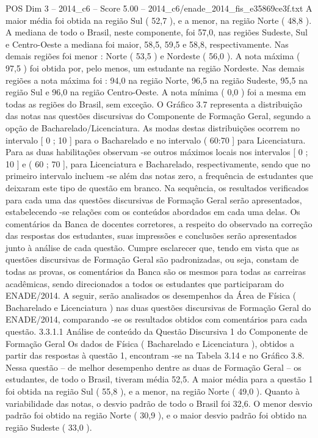 \begin{textsample}{POS Dim 3 – 2014\_c6 – Score 5.00 – 2014\_c6/enade\_2014\_fis\_e35869ce3f.txt}
A maior média foi obtida na região Sul ( 52,7 ), e a menor, na região Norte ( 48,8 ).
A mediana de todo o Brasil, neste componente, foi 57,0, nas regiões Sudeste, Sul e Centro-Oeste a mediana foi maior, 58,5, 59,5 e 58,8, respectivamente.
Nas demais regiões foi menor : Norte ( 53,5 ) e Nordeste ( 56,0 ).
A nota máxima ( 97,5 ) foi obtida por, pelo menos, um estudante na região Nordeste.
Nas demais regiões a nota máxima foi : 94,0 na região Norte, 96,5 na região Sudeste, 95,5 na região Sul e 96,0 na região Centro-Oeste.
A nota mínima ( 0,0 ) foi a mesma em todas as regiões do Brasil, sem exceção.
O Gráfico 3.7 representa a distribuição das notas nas questões discursivas do Componente de Formação Geral, segundo a opção de Bacharelado/Licenciatura.
As modas destas distribuições ocorrem no intervalo [ 0 ; 10 ] para o Bacharelado e no intervalo ( 60:70 ] para Licenciatura.
Para as duas habilitações observam -se outros máximos locais nos intervalos [ 0 ; 10 ] e ( 60 ; 70 ], para Licenciatura e Bacharelado, respectivamente, sendo que no primeiro intervalo incluem -se além das notas zero, a frequência de estudantes que deixaram este tipo de questão em branco.
Na sequência, os resultados verificados para cada uma das questões discursivas de Formação Geral serão apresentados, estabelecendo -se relações com os conteúdos abordados em cada uma delas.
Os comentários da Banca de docentes corretores, a respeito do observado na correção das respostas dos estudantes, suas impressões e conclusões serão apresentados junto à análise de cada questão.
Cumpre esclarecer que, tendo em vista que as questões discursivas de Formação Geral são padronizadas, ou seja, constam de todas as provas, os comentários da Banca são os mesmos para todas as carreiras acadêmicas, sendo direcionados a todos os estudantes que participaram do ENADE/2014.
A seguir, serão analisados os desempenhos da Área de Física ( Bacharelado e Licenciatura ) nas duas questões discursivas de Formação Geral do ENADE/2014, comparando -se os resultados obtidos com comentários para cada questão. 3.3.1.1 Análise de conteúdo da Questão Discursiva 1 do Componente de Formação Geral Os dados de Física ( Bacharelado e Licenciatura ), obtidos a partir das respostas à questão 1, encontram -se na Tabela 3.14 e no Gráfico 3.8.
Nessa questão – de melhor desempenho dentre as duas de Formação Geral – os estudantes, de todo o Brasil, tiveram média 52,5.
A maior média para a questão 1 foi obtida na região Sul ( 55,8 ), e a menor, na região Norte ( 49,0 ).
Quanto à variabilidade das notas, o desvio padrão de todo o Brasil foi 32,6.
O menor desvio padrão foi obtido na região Norte ( 30,9 ), e o maior desvio padrão foi obtido na região Sudeste ( 33,0 ).

\end{textsample}
